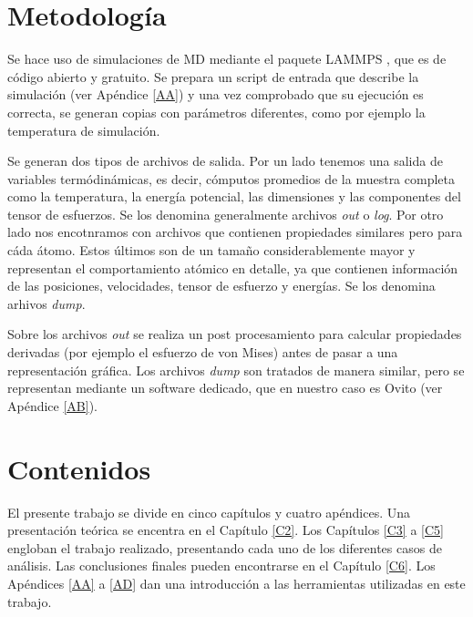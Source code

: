 
\section{Metodología}
\label{S1_9}

Se hace uso de simulaciones de MD mediante el paquete LAMMPS \cite{plimpton95}, que es de código abierto y gratuito. Se prepara un script de entrada que describe la simulación (ver Apéndice \ref{AA}) y una vez comprobado que su ejecución es correcta, se generan copias con parámetros diferentes, como por ejemplo la temperatura de simulación.

Se generan dos tipos de archivos de salida. Por un lado tenemos una salida de variables termódinámicas, es decir, cómputos promedios de la muestra completa como la temperatura, la energía potencial, las dimensiones y las componentes del tensor de esfuerzos. Se los denomina generalmente archivos \textit{out} o \textit{log}. Por otro lado nos encotnramos con archivos que contienen propiedades similares pero para cáda átomo. Estos últimos son de un tamaño considerablemente mayor y representan el comportamiento atómico en detalle, ya que contienen información de las posiciones, velocidades, tensor de esfuerzo y energías. Se los denomina arhivos \textit{dump}.

Sobre los archivos \textit{out} se realiza un post procesamiento para calcular propiedades derivadas (por ejemplo el esfuerzo de von Mises) antes de pasar a una representación gráfica. Los archivos \textit{dump} son tratados de manera similar, pero se representan mediante un  software dedicado, que en nuestro caso es Ovito \citep{stukowski10} (ver Apéndice \ref{AB}).


\section{Contenidos}
\label{S1_10}

El presente trabajo se divide en cinco capítulos y cuatro apéndices. Una presentación teórica se encentra en el Capítulo \ref{C2}. Los Capítulos \ref{C3} a \ref{C5} engloban el trabajo realizado, presentando cada uno de los diferentes casos de análisis. Las conclusiones finales pueden encontrarse en el Capítulo \ref{C6}. Los Apéndices \ref{AA} a \ref{AD} dan una introducción a las herramientas utilizadas en este trabajo.

